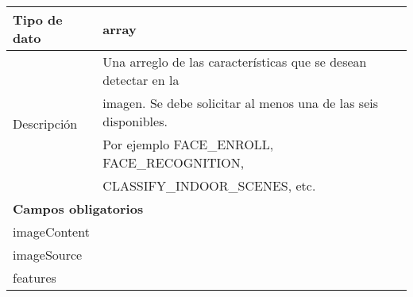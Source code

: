 \begin{table}[h!]
\begin{tabular}{|l|l}
Tipo de dato & \multicolumn{1}{l|}{array}                                                                                                                                                                                                       \\ \hline
\multirow{4}{*}{Descripción}  & 
\multicolumn{1}{l|}{
Una arreglo de las características que se desean detectar
en la} \\
&
\multicolumn{1}{l|}{imagen. Se debe solicitar al menos una de las seis disponibles.} \\&
\multicolumn{1}{l|}{Por ejemplo FACE\_ENROLL, FACE\_RECOGNITION,} \\& 
\multicolumn{1}{l|}{CLASSIFY\_INDOOR\_SCENES, etc.}


\\ \hline
\multicolumn{2}{|l|}{\cellcolor[HTML]{68CBD0}\textbf{Campos obligatorios}}                                                                                                                                                                                              \\ \hline
\multicolumn{2}{|l|}{imageContent}                                                                                                                                                                                                              \\
\multicolumn{2}{|l|}{imageSource}                                                                                                                                                                                                               \\
\multicolumn{2}{|l|}{features}                                                                                                                                                                                                                  \\ \hline
\end{tabular}
\end{table}



